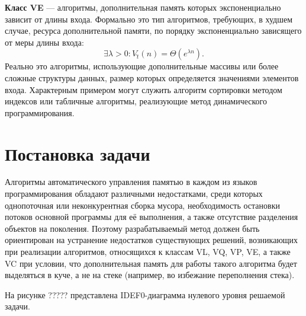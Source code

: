 \textbf{Класс VE} --- алгоритмы, дополнительная память которых экспоненциально зависит от длины входа. Формально это тип алгоритмов, требующих, в худшем случае, ресурса дополнительной памяти, по порядку экспоненциально зависящего от меры длины входа:
\begin{equation}
	\exists \lambda > 0: V\hat{_t}(n) = \Theta(e^{\lambda n}).
\end{equation}
Реально это алгоритмы, использующие дополнительные массивы или более сложные структуры данных, размер которых определяется значениями элементов входа. Характерным примером могут служить алгоритм сортировки методом индексов или табличные алгоритмы, реализующие метод динамического программирования.~\cite{uljanov}


\section{Постановка задачи}

Алгоритмы автоматического управления памятью в каждом из языков программирования обладают различными недостатками, среди которых однопоточная или неконкурентная сборка мусора, необходимость остановки потоков основной программы для её выполнения, а также отсутствие разделения объектов на поколения. Поэтому разрабатываемый метод должен быть ориентирован на устранение недостатков существующих решений, возникающих при реализации алгоритмов, относящихся к классам VL, VQ, VP, VE, а также VC при условии, что дополнительная память для работы такого алгоритма будет выделяться в куче, а не на стеке (например, во избежание переполнения стека).

На рисунке ????? представлена IDEF0-диаграмма нулевого уровня решаемой задачи.

